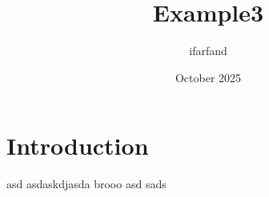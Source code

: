 \documentclass{article}
\title{Example3}
\author{ifarfand }
\date{October 2025}
\begin{document}
\maketitle


\section{Introduction}
asd
asdaskdjasda
brooo
asd
sads
\end{document}
